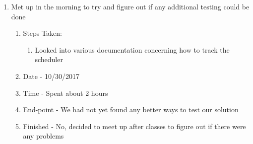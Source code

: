 \documentclass[journal,10pt,onecolumn,compsoc]{IEEEtran} \usepackage[margin=1.0in]{geometry} \usepackage{pdfpages}
\begin{document}
\begin{enumerate}
	\item Met up in the morning to try and figure out if any additional testing could be done
		\begin{enumerate}
			\item Steps Taken:
				\begin{enumerate}
					\item Looked into various documentation concerning how to track the scheduler
				\end{enumerate}
			\item Date - 10/30/2017
			\item Time - Spent about 2 hours
			\item End-point - We had not yet found any better ways to test our solution
			\item Finished - No, decided to meet up after classes to figure out if there were any problems \\
		\end {enumerate}
\end{enumerate}
\end{document}
